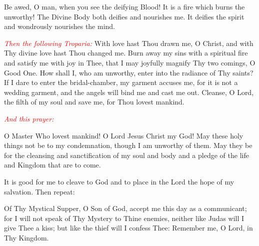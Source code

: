 Be awed, O man, when you see the deifying Blood! It is a fire which burns the unworthy! The Divine Body both deifies and nourishes me. It deifies the spirit and wondrously nourishes the mind.

\textcolor{red}{\textit{Then the following Troparia:}}
With love hast Thou drawn me, O Christ, and with Thy divine love hast Thou changed me. Burn away my sins with a spiritual fire and satisfy me with joy in Thee, that I may joyfully magnify Thy two comings, O Good One. How shall I, who am unworthy, enter into the radiance of Thy saints? If I dare to enter the bridal-chamber, my garment accuses me, for it is not a wedding garment, and the angels will bind me and cast me out. Cleanse, O Lord, the filth of my soul and save me, for Thou lovest mankind.

\textcolor{red}{\textit{And this prayer:}}

O Master Who lovest mankind! O Lord Jesus Christ my God! May these holy things not be to my condemnation, though I am unworthy of them. May they be for the cleansing and sanctification of my soul and body and a pledge of the life and Kingdom that are to come.

It is good for me to cleave to God and to place in the Lord the hope of my salvation. Then repeat:

Of Thy Mystical Supper, O Son of God, accept me this day as a communicant; for I will not speak of Thy Mystery to Thine enemies, neither like Judas will I give Thee a kiss; but like the thief will I confess Thee: Remember me, O Lord, in Thy Kingdom.